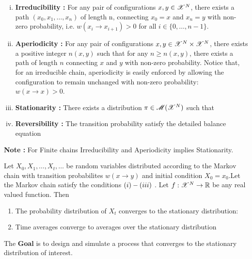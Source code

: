 \documentclass[letterpaper,english,10pt]{article}
\begin{document}
\begin{enumerate}[(i)]
\item \textbf{Irreducibility :} For any pair of configurations $x,y \in \mathscr{X}^N$, there exists a path $(x_0,x_1,\dots, x_n)$ of length n, connecting $x_0 = x$ and $x_n = y$ with non-zero probability, i.e.
$w(x_i \to x_{i+1}) > 0$ for all $i \in \{0,\dots,n-1\}$.

\item \textbf{Aperiodicity :} For any pair of configurations $x,y \in \mathscr{X}^N \times \mathscr{X}^N$, there exists a positive integer $n(x,y)$ such that for any $n \geq n(x,y)$, there exists a path of length $n$ connecting $x$ and $y$ with non-zero probability. Notice that, for an irreducible chain, aperiodicity is easily enforced by allowing the configuration to remain unchanged with non-zero probability: $w(x \to x) > 0$.

\item \textbf{Stationarity :} There exists a distribution $\pi \in \mathscr{M}(\mathscr{X}^N)$ such that
\item \textbf{Reversibility :} The transition probability satisfy the detailed balance equation
\end{enumerate}
\textbf{Note :}
 For Finite chains Irreducibility and Aperiodicity implies Stationarity.
\begin{thm}
 Let $X_0,X_1,\dots, X_t,\dots $ be random variables distributed according to the Markov chain with transition probabilites $w(x \to y)$ and initial condition $X_0 = x_0$.Let the Markov chain satisfy the conditions $(\romannumeral 1) - (\romannumeral 3)$ . Let $f: \mathscr{X}^N \to \mathbb{R}$ be any real valued function. Then
\begin{enumerate}
\item The probability distribution of $X_t$ converges to the stationary distribution:
\item Time averages converge to averages over the stationary distribution
\end{enumerate}
\end{thm}
The \textbf{Goal} is to design and simulate a process that converges to the stationary distribution of interest.
\end{document}

